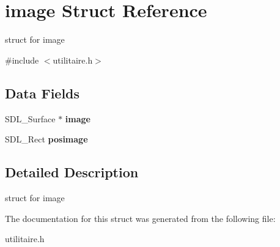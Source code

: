 \hypertarget{structimage}{}\section{image Struct Reference}
\label{structimage}


struct for image  




{\ttfamily \#include $<$utilitaire.\+h$>$}

\subsection*{Data Fields}
\begin{DoxyCompactItemize}
\item 
S\+D\+L\+\_\+\+Surface $\ast$ {\bfseries image}\hypertarget{structimage_a68c71e2eca756ac70ef1b8a2339a5e3f}{}\label{structimage_a68c71e2eca756ac70ef1b8a2339a5e3f}

\item 
S\+D\+L\+\_\+\+Rect {\bfseries posimage}\hypertarget{structimage_a3a1da83b39faccddb0cd937844ba9e0b}{}\label{structimage_a3a1da83b39faccddb0cd937844ba9e0b}

\end{DoxyCompactItemize}


\subsection{Detailed Description}
struct for image 

The documentation for this struct was generated from the following file\+:\begin{DoxyCompactItemize}
\item 
utilitaire.\+h\end{DoxyCompactItemize}
